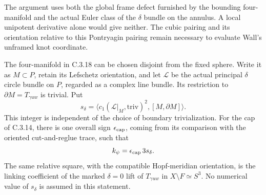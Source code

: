 \begin{remark}[Scope]
The argument uses both the global frame defect furnished by
the bounding four-manifold and the actual Euler class of the
$\delta$ bundle on the annulus. A local unipotent derivative
alone would give neither. The cubic pairing and its orientation
relative to this Pontryagin pairing remain necessary to
evaluate Wall's unframed knot coordinate.
\end{remark}
\begin{proposition}
The four-manifold in C.3.18 can be chosen disjoint from the fixed
sphere. Write it as $M\subset P$, retain its Lefschetz orientation,
and let $\mathcal L$ be the actual principal $\delta$ circle bundle
on $P$, regarded as a complex line bundle. Its restriction to
$\partial M=T_{\gamma uw}$ is trivial. Put
\[
 s_\delta=\langle c_1(\mathcal L|_M,\mathrm{triv})^2,
                         [M,\partial M]\rangle.
\]
This integer is independent of the choice of boundary trivialization.
For the cap of C.3.14, there is one overall sign $\epsilon_{\rm cap}$,
coming from its comparison with the oriented cut-and-reglue trace,
such that
\[
 k_\psi=\epsilon_{\rm cap}\,3s_\delta.
\]
The same relative square, with the compatible Hopf-meridian
orientation, is the linking coefficient of the marked
$\delta=0$ lift of $T_{\gamma uw}$ in $X\setminus F\simeq S^3$.
No numerical value of $s_\delta$ is assumed in this statement.
\end{proposition}
